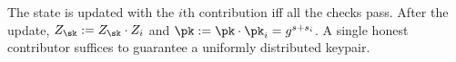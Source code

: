 The state is updated with the $i$th contribution iff all the checks pass. After the update, $Z_{\sk}:=Z_{\sk}\cdot Z_i$ and $\pk:=\pk\cdot \pk_i =g^{s+s_i}$. A single honest contributor suffices to guarantee a uniformly distributed keypair. 


